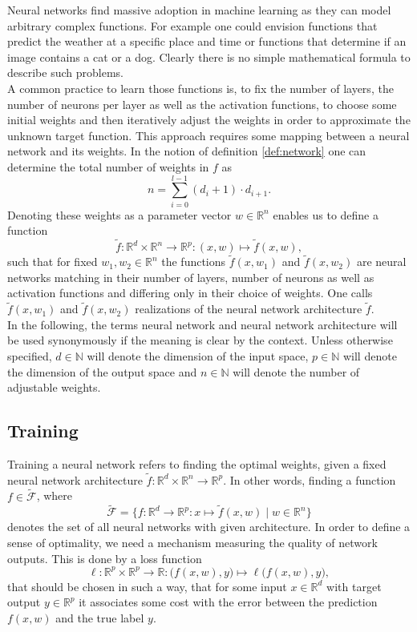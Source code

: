 \documentclass[11pt, a4paper]{article}
\newcommand{\N}{\mathds{N}}
\newcommand{\R}{\mathds{R}}
\newcommand{\F}{\mathcal{F}}
\begin{document}
Neural networks find massive adoption in machine learning as they can model arbitrary complex functions. For example one could envision functions that predict the weather at a specific place and time or functions that determine if an image contains a cat or a dog. Clearly there is no simple mathematical formula to describe such problems. \\

A common practice to learn those functions is, to fix the number of layers, the number of neurons per layer as well as the activation functions, to choose some initial weights and then iteratively adjust the weights in order to approximate the unknown target function. This approach requires some mapping between a neural network and its weights. In the notion of definition \ref{def:network} one can determine the total number of weights in $f$ as
\[ n = \sum_{i=0}^{l-1} (d_i + 1) \cdot d_{i+1}. \]
Denoting these weights as a parameter vector $w \in \R^n$ enables us to define a function
\[ \tilde{f} : \R^d \times \R^n \to \R^p : (x,w) \mapsto \tilde{f}(x,w), \]
such that for fixed $w_1, w_2 \in \R^n$ the functions $\tilde{f}(x,w_1)$ and $\tilde{f}(x,w_2)$ are neural networks matching in their number of layers, number of neurons as well as activation functions and differing only in their choice of weights. One calls $\tilde{f}(x,w_1)$ and $\tilde{f}(x,w_2)$ realizations of the neural network architecture $\tilde{f}$. \\

In the following, the terms neural network and neural network architecture will be used synonymously if the meaning is clear by the context. Unless otherwise specified, $d \in \N$ will denote the dimension of the input space, $p \in \N$ will denote the dimension of the output space and $n \in \N$ will denote the number of adjustable weights.

\subsection{Training}\label{sec:Training}

Training a neural network refers to finding the optimal weights, given a fixed neural network architecture $\tilde{f} : \R^d \times \R^n \to \R^p$. In other words, finding a function $f \in \tilde{\F}$, where
\[ \tilde{\F} = \Big \{ f : \R^d \to \R^p : x \mapsto \tilde{f}(x,w) \mid w \in \R^n \Big \} \]
denotes the set of all neural networks with given architecture. In order to define a sense of optimality, we need a mechanism measuring the quality of network outputs. This is done by a loss function
\[ \ell : \R^p \times \R^p \to \R : \big ( f(x,w),y \big ) \mapsto \ell \big ( f(x,w),y \big ) ,\]
that should be chosen in such a way, that for some input $x \in \R^d$ with target output $y \in \R^p$ it associates some cost with the error between the prediction $f(x,w)$ and the true label $y$. \\
\end{document}
